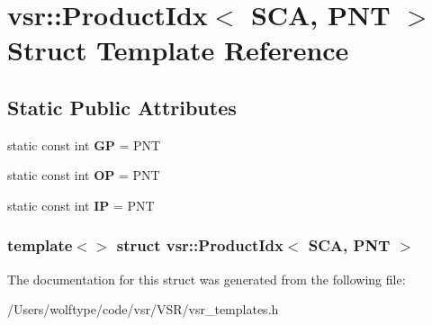 \hypertarget{structvsr_1_1_product_idx_3_01_s_c_a_00_01_p_n_t_01_4}{\section{vsr\-:\-:Product\-Idx$<$ S\-C\-A, P\-N\-T $>$ Struct Template Reference}
\label{structvsr_1_1_product_idx_3_01_s_c_a_00_01_p_n_t_01_4}
}
\subsection*{Static Public Attributes}
\begin{DoxyCompactItemize}
\item 
\hypertarget{structvsr_1_1_product_idx_3_01_s_c_a_00_01_p_n_t_01_4_a6a9c03d418d61c5d84cfdbd257ab3c66}{static const int {\bfseries G\-P} = P\-N\-T}\label{structvsr_1_1_product_idx_3_01_s_c_a_00_01_p_n_t_01_4_a6a9c03d418d61c5d84cfdbd257ab3c66}

\item 
\hypertarget{structvsr_1_1_product_idx_3_01_s_c_a_00_01_p_n_t_01_4_adb4bffd088ddf01182ff977bff0c577b}{static const int {\bfseries O\-P} = P\-N\-T}\label{structvsr_1_1_product_idx_3_01_s_c_a_00_01_p_n_t_01_4_adb4bffd088ddf01182ff977bff0c577b}

\item 
\hypertarget{structvsr_1_1_product_idx_3_01_s_c_a_00_01_p_n_t_01_4_a94e21a39929ac9c0fb734b47e2ae8c22}{static const int {\bfseries I\-P} = P\-N\-T}\label{structvsr_1_1_product_idx_3_01_s_c_a_00_01_p_n_t_01_4_a94e21a39929ac9c0fb734b47e2ae8c22}

\end{DoxyCompactItemize}
\subsubsection*{template$<$$>$ struct vsr\-::\-Product\-Idx$<$ S\-C\-A, P\-N\-T $>$}



The documentation for this struct was generated from the following file\-:\begin{DoxyCompactItemize}
\item 
/\-Users/wolftype/code/vsr/\-V\-S\-R/vsr\-\_\-templates.\-h\end{DoxyCompactItemize}

